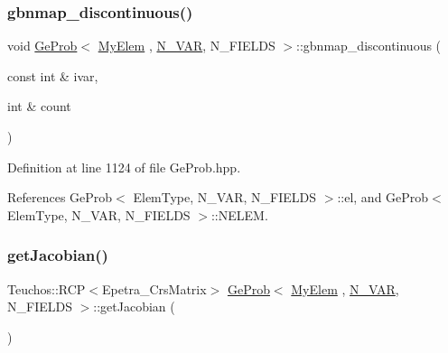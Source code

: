 \mbox{\label{classGeProb_a4ceec7b2e7cad8ba29dd8d751840a22b}} 
\subsubsection{\texorpdfstring{gbnmap\+\_\+discontinuous()}{gbnmap\_discontinuous()}}
{\footnotesize\ttfamily void \hyperlink{classGeProb}{Ge\+Prob}$<$ \hyperlink{DG__Prob_8h_a83cd887ced9a6587428f267e50cd4787}{My\+Elem} , \hyperlink{classED__Prob_a4e7d2ff1a8e435e336fb00c527224b5a}{N\+\_\+\+V\+AR}, N\+\_\+\+F\+I\+E\+L\+DS $>$\+::gbnmap\+\_\+discontinuous (\begin{DoxyParamCaption}\item[{const int \&}]{ivar,  }\item[{int \&}]{count }\end{DoxyParamCaption})\hspace{0.3cm}{\ttfamily [inherited]}}



Definition at line 1124 of file Ge\+Prob.\+hpp.



References Ge\+Prob$<$ Elem\+Type, N\+\_\+\+V\+A\+R, N\+\_\+\+F\+I\+E\+L\+D\+S $>$\+::el, and Ge\+Prob$<$ Elem\+Type, N\+\_\+\+V\+A\+R, N\+\_\+\+F\+I\+E\+L\+D\+S $>$\+::\+N\+E\+L\+EM.

\mbox{\label{classGeProb_a5c8159fd807c26eaec5c0a9fa72636f6}} 
\subsubsection{\texorpdfstring{get\+Jacobian()}{getJacobian()}}
{\footnotesize\ttfamily Teuchos\+::\+R\+CP$<$Epetra\+\_\+\+Crs\+Matrix$>$ \hyperlink{classGeProb}{Ge\+Prob}$<$ \hyperlink{DG__Prob_8h_a83cd887ced9a6587428f267e50cd4787}{My\+Elem} , \hyperlink{classED__Prob_a4e7d2ff1a8e435e336fb00c527224b5a}{N\+\_\+\+V\+AR}, N\+\_\+\+F\+I\+E\+L\+DS $>$\+::get\+Jacobian (\begin{DoxyParamCaption}{ }\end{DoxyParamCaption})\hspace{0.3cm}{\ttfamily [inherited]}}

